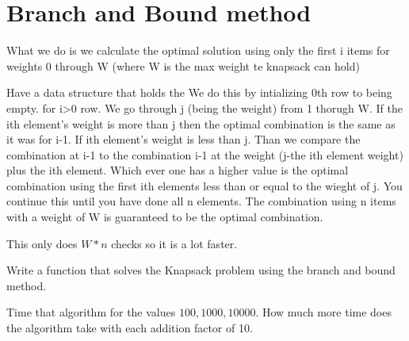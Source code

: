\section*{Branch and Bound method}
What we do is we calculate the optimal solution using only the first i items for weights 0 through W (where W is the max weight te knapsack can hold) 

Have a data structure that holds the
We do this by intializing 0th row to being empty.
for i>0 row. We go through j (being the weight) from 1 thorugh W. If the ith element's weight is more than j then the optimal combination is the same as it was for i-1. If ith element's weight is less than j. Than we compare the combination at i-1 to the combination i-1 at the weight (j-the ith element weight) plus the ith element. Which ever one has a higher value is the optimal combination using the first ith elements less than or equal to the wieght of j. You continue this until you have done all n elements. The combination using n items with a weight of W is guaranteed to be the optimal combination.

This only does $W*n$ checks so it is a lot faster.

\begin{problem}
Write a function that solves the Knapsack problem using the branch and bound method.
\end{problem}

\begin{problem}
Time that algorithm for the values $100, 1000, 10000$. How much more time does the algorithm take with each addition factor of 10.
\end{problem}
